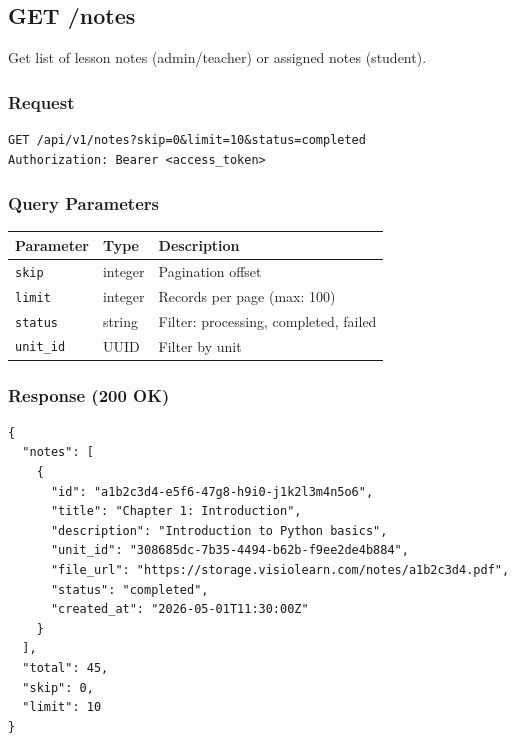 \documentclass[12pt,a4paper,oneside]{article}
\begin{document}
\subsection{GET /notes}

Get list of lesson notes (admin/teacher) or assigned notes (student).

\subsubsection{Request}

\begin{lstlisting}
GET /api/v1/notes?skip=0&limit=10&status=completed
Authorization: Bearer <access_token>
\end{lstlisting}

\subsubsection{Query Parameters}

\begin{table}[H]
\centering
\small
\begin{tabular}{|l|l|l|}
\hline
\textbf{Parameter} & \textbf{Type} & \textbf{Description} \\
\hline
\texttt{skip} & integer & Pagination offset \\
\hline
\texttt{limit} & integer & Records per page (max: 100) \\
\hline
\texttt{status} & string & Filter: processing, completed, failed \\
\hline
\texttt{unit\_id} & UUID & Filter by unit \\
\hline
\end{tabular}
\end{table}

\subsubsection{Response (200 OK)}

\begin{lstlisting}
{
  "notes": [
    {
      "id": "a1b2c3d4-e5f6-47g8-h9i0-j1k2l3m4n5o6",
      "title": "Chapter 1: Introduction",
      "description": "Introduction to Python basics",
      "unit_id": "308685dc-7b35-4494-b62b-f9ee2de4b884",
      "file_url": "https://storage.visiolearn.com/notes/a1b2c3d4.pdf",
      "status": "completed",
      "created_at": "2026-05-01T11:30:00Z"
    }
  ],
  "total": 45,
  "skip": 0,
  "limit": 10
}
\end{lstlisting}
\end{document}
